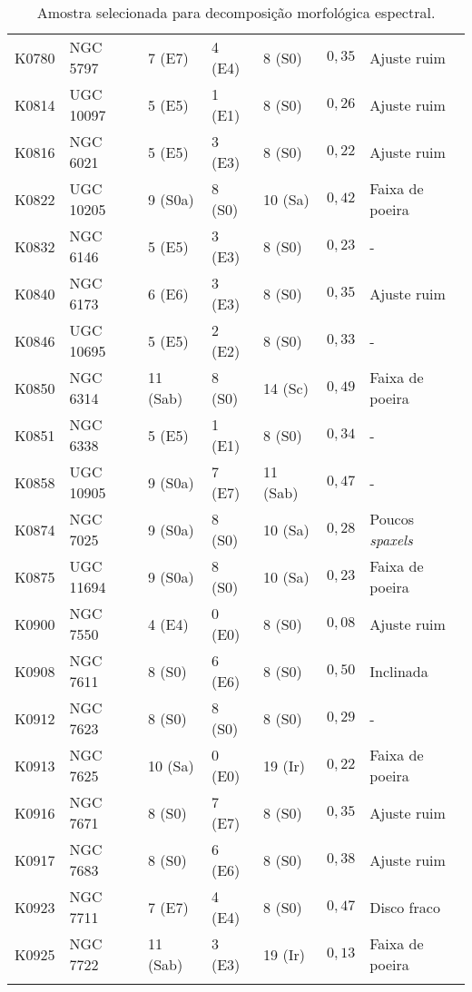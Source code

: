 \begin{longtable}{ l l l l l l l }
K0780 & NGC 5797  &  7 (E7)  & 4 (E4) &  8 (S0)  & $0,35$ & Ajuste ruim \\
K0814 & UGC 10097 &  5 (E5)  & 1 (E1) &  8 (S0)  & $0,26$ & Ajuste ruim \\
K0816 & NGC 6021  &  5 (E5)  & 3 (E3) &  8 (S0)  & $0,22$ & Ajuste ruim \\
K0822 & UGC 10205 &  9 (S0a) & 8 (S0) & 10 (Sa)  & $0,42$ & Faixa de poeira \\
K0832 & NGC 6146  &  5 (E5)  & 3 (E3) &  8 (S0)  & $0,23$ & - \\
K0840 & NGC 6173  &  6 (E6)  & 3 (E3) &  8 (S0)  & $0,35$ & Ajuste ruim \\
K0846 & UGC 10695 &  5 (E5)  & 2 (E2) &  8 (S0)  & $0,33$ & - \\
K0850 & NGC 6314  & 11 (Sab) & 8 (S0) & 14 (Sc)  & $0,49$ & Faixa de poeira \\
K0851 & NGC 6338  &  5 (E5)  & 1 (E1) &  8 (S0)  & $0,34$ & - \\
K0858 & UGC 10905 &  9 (S0a) & 7 (E7) & 11 (Sab) & $0,47$ & - \\
K0874 & NGC 7025  &  9 (S0a) & 8 (S0) & 10 (Sa)  & $0,28$ & Poucos {\em spaxels} \\
K0875 & UGC 11694 &  9 (S0a) & 8 (S0) & 10 (Sa)  & $0,23$ & Faixa de poeira \\
K0900 & NGC 7550  &  4 (E4)  & 0 (E0) &  8 (S0)  & $0,08$ & Ajuste ruim \\
K0908 & NGC 7611  &  8 (S0)  & 6 (E6) &  8 (S0)  & $0,50$ & Inclinada \\
K0912 & NGC 7623  &  8 (S0)  & 8 (S0) &  8 (S0)  & $0,29$ & - \\
K0913 & NGC 7625  & 10 (Sa)  & 0 (E0) & 19 (Ir)  & $0,22$ & Faixa de poeira \\
K0916 & NGC 7671  &  8 (S0)  & 7 (E7) &  8 (S0)  & $0,35$ & Ajuste ruim \\
K0917 & NGC 7683  &  8 (S0)  & 6 (E6) &  8 (S0)  & $0,38$ & Ajuste ruim \\
K0923 & NGC 7711  &  7 (E7)  & 4 (E4) &  8 (S0)  & $0,47$ & Disco fraco \\
K0925 & NGC 7722  & 11 (Sab) & 3 (E3) & 19 (Ir)  & $0,13$ & Faixa de poeira \\
\hline
\caption[Amostra selecionada para decomposição morfológica espectral]
{Amostra selecionada para decomposição morfológica espectral.}
\label{tab:DecompSample}
\end{longtable}

\normalsize

